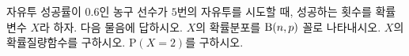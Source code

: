 자유투 성공률이 $0.6$인 농구 선수가 $5$번의 자유투를 시도할 때, 성공하는 횟수를 확률변수 $X$라 하자. 다음 물음에 답하시오.
 $X$의 확률분포를 $\mathrm{B}(n{,}\mkern3mu\mathopen{}p)$ 꼴로 나타내시오.
 $X$의 확률질량함수를 구하시오.
 $\mathrm{P}(X=2)$를 구하시오.
